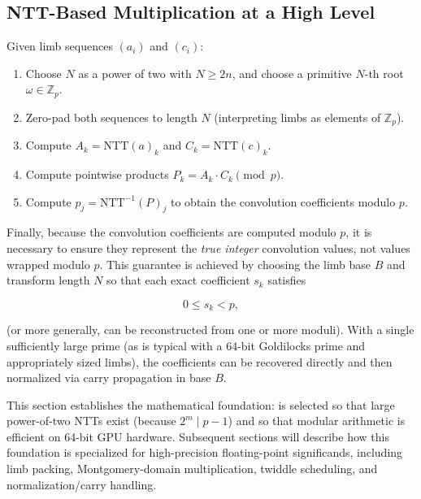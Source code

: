 \subsection{NTT-Based Multiplication at a High Level}

Given limb sequences $(a_i)$ and $(c_i)$:

\begin{enumerate}

  \item Choose $N$ as a power of two with $N \ge 2n$, and choose a primitive
  $N$-th root $\omega \in \mathbb{Z}_p$.

  \item Zero-pad both sequences to length $N$ (interpreting limbs as elements of
  $\mathbb{Z}_p$).

  \item Compute $A_k = \mathrm{NTT}(a)_k$ and $C_k = \mathrm{NTT}(c)_k$.

  \item Compute pointwise products $P_k = A_k \cdot C_k \pmod p$.

  \item Compute $p_j = \mathrm{NTT}^{-1}(P)_j$ to obtain the convolution
  coefficients modulo $p$.

\end{enumerate}

Finally, because the convolution coefficients are computed modulo $p$, it is
necessary to ensure they represent the \emph{true integer} convolution values, not values
wrapped modulo $p$. This guarantee is achieved by choosing the limb base $B$ and transform
length $N$ so that each exact coefficient $s_k$ satisfies

\[
0 \le s_k < p,
\]

(or more generally, can be reconstructed from one or more moduli). With a single
sufficiently large prime (as is typical with a 64-bit Goldilocks prime and
appropriately sized limbs), the coefficients can be recovered directly and then
normalized via carry propagation in base $B$.

\medskip

This section establishes the mathematical foundation:  is
selected so that large power-of-two NTTs exist (because $2^m \mid p-1$) and so
that modular arithmetic is efficient on 64-bit GPU hardware. Subsequent sections
will describe how this foundation is specialized for high-precision floating-point
significands, including limb packing, Montgomery-domain multiplication, twiddle
scheduling, and normalization/carry handling.

